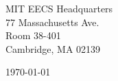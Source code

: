 \begin{minipage}{0.49\textwidth}
\begin{flushleft}
\noindent
MIT EECS Headquarters\\
77 Massachusetts Ave.\\
Room 38-401\\
Cambridge, MA 02139
\end{flushleft}
\end{minipage}
\begin{minipage}{0.47\textwidth}
\begin{flushright}
\today
\end{flushright}
\end{minipage} \\

\newcommand{\univ}{Massachusetts Institute of Technology}
\newcommand{\univshort}{MIT}
\newcommand{\degree}{Ph.D.}
\newcommand{\dept}{Computer Science}
